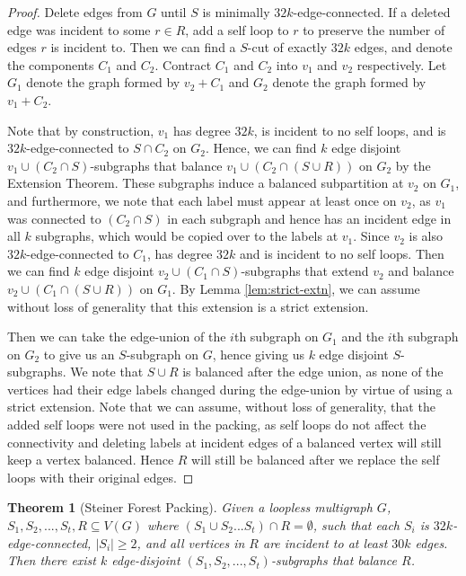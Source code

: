 \documentclass{article}
\newtheorem{theorem}{Theorem}[section]
\begin{document}
\begin{proof}
    Delete edges from $G$ until $S$ is minimally $32k$-edge-connected. If a deleted edge was incident to some $r \in R$, add a self loop to $r$ to preserve the number of edges $r$ is incident to. Then we can find a $S$-cut of exactly $32k$ edges, and denote the components $C_1$ and $C_2$. Contract $C_1$ and $C_2$ into $v_1$ and $v_2$ respectively. Let $G_1$ denote the graph formed by $v_2+C_1$ and $G_2$ denote the graph formed by $v_1+C_2$. 

    Note that by construction, $v_1$ has degree $32k$, is incident to no self loops, and is $32k$-edge-connected to $S \cap C_2$ on $G_2$. Hence, we can find $k$ edge disjoint $v_1 \cup (C_2 \cap S)$-subgraphs that balance $v_1 \cup (C_2 \cap (S \cup R))$ on $G_2$ by the Extension Theorem. These subgraphs induce a balanced subpartition at $v_2$ on $G_1$, and furthermore, we note that each label must appear at least once on $v_2$, as $v_1$ was connected to $(C_2 \cap S)$ in each subgraph and hence has an incident edge in all $k$ subgraphs, which would be copied over to the labels at $v_1$. Since $v_2$ is also $32k$-edge-connected to $C_1$, has degree $32k$ and is incident to no self loops. Then we can find $k$ edge disjoint $v_2 \cup (C_1 \cap S)$-subgraphs that extend $v_2$ and balance $v_2 \cup (C_1 \cap (S \cup R))$ on $G_1$. By Lemma \ref{lem:strict-extn}, we can assume without loss of generality that this extension is a strict extension.
    
    Then we can take the edge-union of the $i$th subgraph on $G_1$ and the $i$th subgraph on $G_2$ to give us an $S$-subgraph on $G$, hence giving us $k$ edge disjoint $S$-subgraphs. We note that $S \cup R$ is balanced after the edge union, as none of the vertices had their edge labels changed during the edge-union by virtue of using a strict extension. Note that we can assume, without loss of generality, that the added self loops were not used in the packing, as self loops do not affect the connectivity and deleting labels at incident edges of a balanced vertex will still keep a vertex balanced. Hence $R$ will still be balanced after we replace the self loops with their original edges. 
\end{proof}

\begin{theorem}[Steiner Forest Packing]
    Given a loopless multigraph $G$, $S_1,S_2,...,S_t, R \subseteq V(G)$ where $(S_1 \cup S_2...S_t) \cap R = \emptyset$, such that each $S_i$ is $32k$-edge-connected, $|S_i| \geq 2$, and all vertices in $R$ are incident to at least $30k$ edges. Then there exist $k$ edge-disjoint $(S_1,S_2,...,S_t)$-subgraphs that balance $R$. 
\end{theorem}
\end{document}
